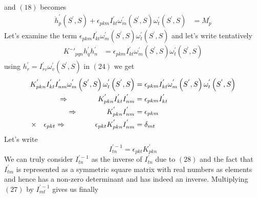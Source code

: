 and $(18)$ becomes 
\begin{align}
\dot{h}^{'}_p\left(S^{'},S\right)+\epsilon_{pkm}I^{'}_{kt}\omega^{'}_{m}\left(S^{'},S\right)\omega^{'}_t\left(S^{'},S\right)&= M^{'}_p
\end{align}
Let's examine the term $\epsilon_{pkm}I^{'}_{kt}\omega^{'}_{m}\left(S^{'},S\right)\omega^{'}_t\left(S^{'},S\right)$ and let's write tentatively
\begin{align}
K¨{'}_{pqn}h^{'}_qh^{'}_n&=\epsilon_{pkm}I^{'}_{kt}\omega^{'}_{m}\left(S^{'},S\right)\omega^{'}_t\left(S^{'},S\right)
\end{align}
using $h^{'}_{r} = I^{'}_{rv}\omega^{'}_{v}\left(S^{'},S\right)$ in $(24)$ we get
\begin{align}
K^{'}_{pkn}I^{'}_{kt}I^{'}_{nm}\omega^{'}_{m}\left(S^{'},S\right)\omega^{'}_{t}\left(S^{'},S\right)&=\epsilon_{pkm}I^{'}_{kt}\omega^{'}_{m}\left(S^{'},S\right)\omega^{'}_t\left(S^{'},S\right)\\
\Rightarrow\quad\quad\quad\quad K^{'}_{pkn}I^{'}_{kt}I^{'}_{nm}&=\epsilon_{pkm}I^{'}_{kt}\\
\Rightarrow\quad\quad\quad\quad K^{'}_{pkn}I^{'}_{nm}&=\epsilon_{pkm}\\
\times\quad\epsilon_{pkt}\Rightarrow \quad\quad\quad\quad \epsilon_{pkt}K^{'}_{pkn}I^{'}_{nm}&= \delta_{mt}
\end{align}
Let's write $$ I^{'-1}_{tn}=\epsilon_{pkt}K^{'}_{pkn}$$We can truly consider $I^{'-1}_{tn}$ as the inverse of $I^{'}_{tn}$ due to $(28)$ and the fact that $I^{'}_{tm}$ is represented as a symmetric square matrix with real numbers as elements and hence has a non-zero determinant and has indeed an inverse. Multiplying $(27)$ by $I^{'-1}_{mt}$ gives us finally


